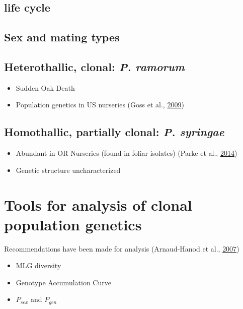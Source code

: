 \documentclass[double,12pt]{beavtex}
\providecommand{\tightlist}{%
  \setlength{\itemsep}{0pt}\setlength{\parskip}{0pt}}
\begin{document}
  \subsection{life cycle}\label{life-cycle}
  
  \subsection{Sex and mating types}\label{sex-and-mating-types}
  
  \subsection{\texorpdfstring{Heterothallic, clonal: \emph{P.
  ramorum}}{Heterothallic, clonal: P. ramorum}}\label{heterothallic-clonal-p.-ramorum}
  
  \begin{itemize}
  \tightlist
  \item
    Sudden Oak Death
  \item
    Population genetics in US nurseries (Goss et al.,
    \protect\hyperlink{ref-goss2009population}{2009})
  \end{itemize}
  
  \subsection{\texorpdfstring{Homothallic, partially clonal: \emph{P.
  syringae}}{Homothallic, partially clonal: P. syringae}}\label{homothallic-partially-clonal-p.-syringae}
  
  \begin{itemize}
  \tightlist
  \item
    Abundant in OR Nurseries (found in foliar isolates) (Parke et al.,
    \protect\hyperlink{ref-parke2014phytophthora}{2014})
  \item
    Genetic structure uncharacterized
  \end{itemize}
  
  \section{Tools for analysis of clonal population
  genetics}\label{tools-for-analysis-of-clonal-population-genetics}
  
  Recommendations have been made for analysis (Arnaud-Hanod et al.,
  \protect\hyperlink{ref-arnaud2007standardizing}{2007})
  
  \begin{itemize}
  \tightlist
  \item
    MLG diversity
  \item
    Genotype Accumulation Curve
  \item
    \(P_{sex}\) and \(P_{gen}\)
  \end{itemize}
  
\end{document}
